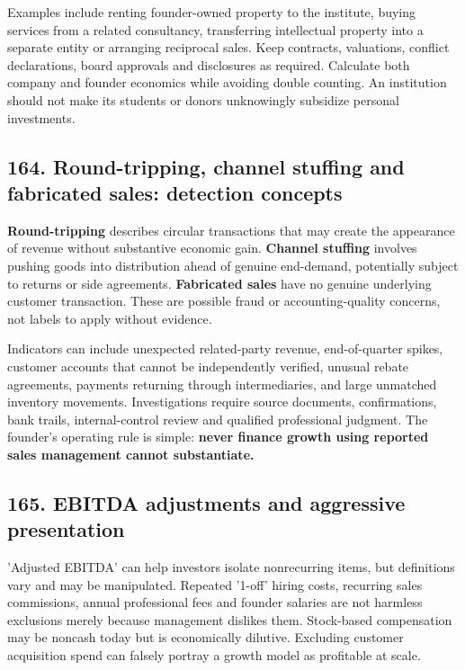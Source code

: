 Examples include renting founder-owned property to the institute, buying services from a related consultancy, transferring intellectual property into a separate entity or arranging reciprocal sales. Keep contracts, valuations, conflict declarations, board approvals and disclosures as required. Calculate both company and founder economics while avoiding double counting. An institution should not make its students or donors unknowingly subsidize personal investments.

\subsection{164. Round-tripping, channel stuffing and fabricated sales: detection concepts}


\textbf{Round-tripping} describes circular transactions that may create the appearance of revenue without substantive economic gain. \textbf{Channel stuffing} involves pushing goods into distribution ahead of genuine end-demand, potentially subject to returns or side agreements. \textbf{Fabricated sales} have no genuine underlying customer transaction. These are possible fraud or accounting-quality concerns, not labels to apply without evidence.

Indicators can include unexpected related-party revenue, end-of-quarter spikes, customer accounts that cannot be independently verified, unusual rebate agreements, payments returning through intermediaries, and large unmatched inventory movements. Investigations require source documents, confirmations, bank trails, internal-control review and qualified professional judgment. The founder's operating rule is simple: \textbf{never finance growth using reported sales management cannot substantiate.}

\subsection{165. EBITDA adjustments and aggressive presentation}


'Adjusted EBITDA' can help investors isolate nonrecurring items, but definitions vary and may be manipulated. Repeated '1-off' hiring costs, recurring sales commissions, annual professional fees and founder salaries are not harmless exclusions merely because management dislikes them. Stock-based compensation may be noncash today but is economically dilutive. Excluding customer acquisition spend can falsely portray a growth model as profitable at scale.

